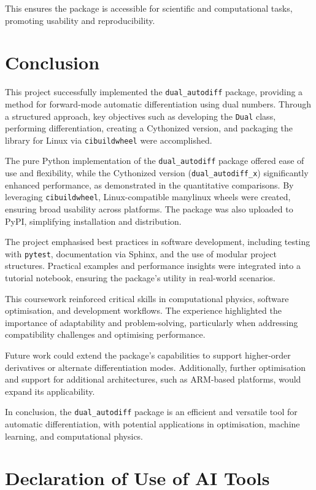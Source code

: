 \documentclass[a4paper,12pt]{article}
\begin{document}
This ensures the package is accessible for scientific and computational tasks, promoting usability and reproducibility.

\section{Conclusion}

This project successfully implemented the \texttt{dual\_autodiff} package, providing a method for forward-mode automatic differentiation using dual numbers. Through a structured approach, key objectives such as developing the \texttt{Dual} class, performing differentiation, creating a Cythonized version, and packaging the library for Linux via \texttt{cibuildwheel} were accomplished.

The pure Python implementation of the \texttt{dual\_autodiff} package offered ease of use and flexibility, while the Cythonized version (\texttt{dual\_autodiff\_x}) significantly enhanced performance, as demonstrated in the quantitative comparisons. By leveraging \texttt{cibuildwheel}, Linux-compatible manylinux wheels were created, ensuring broad usability across platforms. The package was also uploaded to PyPI, simplifying installation and distribution.

The project emphasised best practices in software development, including testing with \texttt{pytest}, documentation via Sphinx, and the use of modular project structures. Practical examples and performance insights were integrated into a tutorial notebook, ensuring the package's utility in real-world scenarios.

This coursework reinforced critical skills in computational physics, software optimisation, and development workflows. The experience highlighted the importance of adaptability and problem-solving, particularly when addressing compatibility challenges and optimising performance.

Future work could extend the package's capabilities to support higher-order derivatives or alternate differentiation modes. Additionally, further optimisation and support for additional architectures, such as ARM-based platforms, would expand its applicability.

In conclusion, the \texttt{dual\_autodiff} package is an efficient and versatile tool for automatic differentiation, with potential applications in optimisation, machine learning, and computational physics.

\section*{Declaration of Use of AI Tools}
\end{document}
